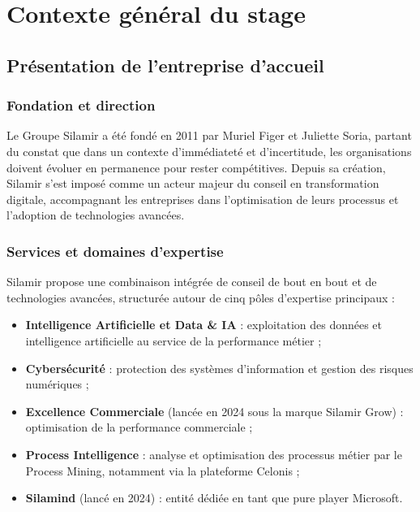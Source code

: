 
\chapter{Contexte général du stage}

\section{Présentation de l'entreprise d'accueil}

\subsection{Fondation et direction}

Le Groupe Silamir a été fondé en 2011 par Muriel Figer et Juliette Soria, partant du constat que dans un contexte d'immédiateté et d'incertitude, les organisations doivent évoluer en permanence pour rester compétitives. Depuis sa création, Silamir s'est imposé comme un acteur majeur du conseil en transformation digitale, accompagnant les entreprises dans l'optimisation de leurs processus et l'adoption de technologies avancées.

\subsection{Services et domaines d'expertise}

Silamir propose une combinaison intégrée de conseil de bout en bout et de technologies avancées, structurée autour de cinq pôles d'expertise principaux :

\begin{itemize}
    \item \textbf{Intelligence Artificielle et Data \& IA} : exploitation des données et intelligence artificielle au service de la performance métier ;
    \item \textbf{Cybersécurité} : protection des systèmes d'information et gestion des risques numériques ;
    \item \textbf{Excellence Commerciale} (lancée en 2024 sous la marque Silamir Grow) : optimisation de la performance commerciale ;
    \item \textbf{Process Intelligence} : analyse et optimisation des processus métier par le Process Mining, notamment via la plateforme Celonis ;
    \item \textbf{Silamind} (lancé en 2024) : entité dédiée en tant que pure player Microsoft.
\end{itemize}

